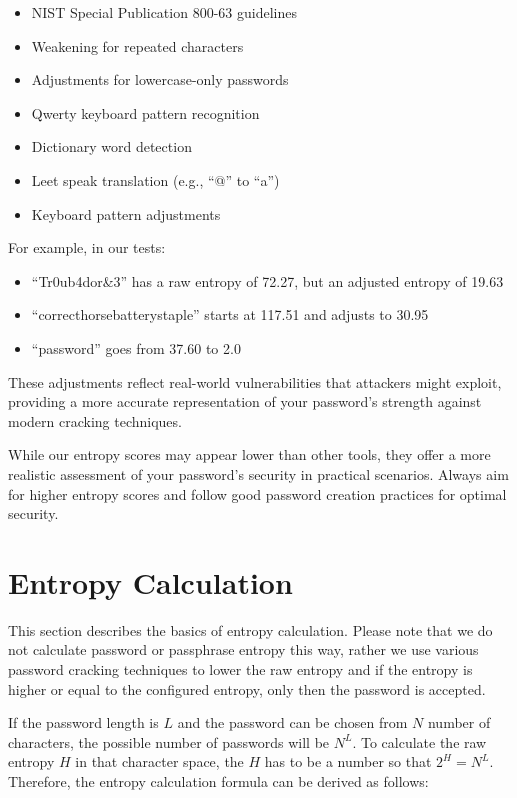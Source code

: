 \begin{itemize}
    \item NIST Special Publication 800-63 guidelines
    \item Weakening for repeated characters
    \item Adjustments for lowercase-only passwords
    \item Qwerty keyboard pattern recognition
    \item Dictionary word detection
    \item Leet speak translation (e.g., ``@'' to ``a'')
    \item Keyboard pattern adjustments
\end{itemize}
For example, in our tests:
\begin{itemize}
    \item ``Tr0ub4dor\&3'' has a raw entropy of 72.27, but an adjusted entropy of 19.63
    \item ``correcthorsebatterystaple'' starts at 117.51 and adjusts to 30.95
    \item ``password'' goes from 37.60 to 2.0
\end{itemize}

These adjustments reflect real-world vulnerabilities that attackers might exploit, providing a more accurate representation of your password's strength against modern cracking techniques.

While our entropy scores may appear lower than other tools, they offer a more realistic assessment of your password's security in practical scenarios. Always aim for higher entropy scores and follow good password creation practices for optimal security.

\section{Entropy Calculation}
This section describes the basics of entropy calculation. Please note that we
do not calculate password or passphrase entropy this way, rather we
use various password cracking techniques to lower the raw entropy and if the
entropy is higher or equal to the configured entropy, only then the password
is accepted.

If the password length is $L$ and the password can be chosen from $N$ number of
characters, the possible number of passwords will be $N^L$. To calculate the raw 
entropy $H$ in that character space, the $H$ has to be a number so that
$2^H = N^L$. Therefore, the entropy calculation formula can be derived as follows:

